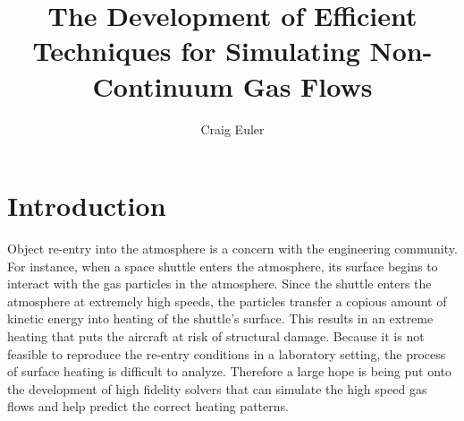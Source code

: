 \documentclass[12pt]{CSUNthesis}
\author{Craig Euler}
\title{The Development of Efficient Techniques for Simulating Non-Continuum Gas Flows}
\begin{document}
\doublespacing

\def\R{\mathbb{R}}
\def\T{\mathbb{T}}

\newenvironment{myequation}
{\setcounter{equation}{\value{subsection}}\begin{equation}}
{\stepcounter{subsection}\end{equation}}
\renewcommand{\theequation}{\mbox{\arabic{section}.\arabic{equation}}}

\newcommand{\tab}{\hspace*{2em}}

\chapter{Introduction}

Object re-entry into the atmosphere is a concern with the engineering community. For instance, when a space shuttle enters the atmosphere, its surface begins to interact with the gas particles in the atmosphere. Since the shuttle enters the atmosphere at extremely high speeds, the particles transfer a copious amount of kinetic energy into heating of the shuttle's surface. This results in an extreme heating that puts the aircraft at risk of structural damage. Because it is not feasible to reproduce the re-entry conditions in a laboratory setting, the process of surface heating is difficult to analyze. Therefore a large hope is being put onto the development of high fidelity solvers that can simulate the high speed gas flows and help predict the correct heating patterns. 

\end{document}
